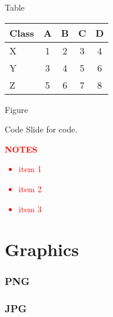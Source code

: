 \begin{frame}{Table}
\begin{tabular}{lcccc}
  Class & A & B & C & D \\\hline
  X     & 1 & 2 & 3 & 4 \pause\\
  Y     & 3 & 4 & 5 & 6 \pause\\
  Z     &5&6&7&8
\end{tabular}
\end{frame}

\begin{frame}{Figure}
  \begin{figure}
  \end{figure}
\end{frame}

\begin{frame}[fragile]{Code}
  Slide for code.
  
\end{frame}
\begin{versiona}
  \textcolor{red}{\textbf{NOTES}
    \begin{itemize}
    \item item 1
    \item item 2
    \item item 3
  \end{itemize}}
\end{versiona}

\section{Graphics}

\begin{frame}
  \frametitle{PNG}
  \begin{center}
  \end{center}
\end{frame}

\begin{frame}
  \frametitle{JPG}
  \begin{center}
  \end{center}
\end{frame}


